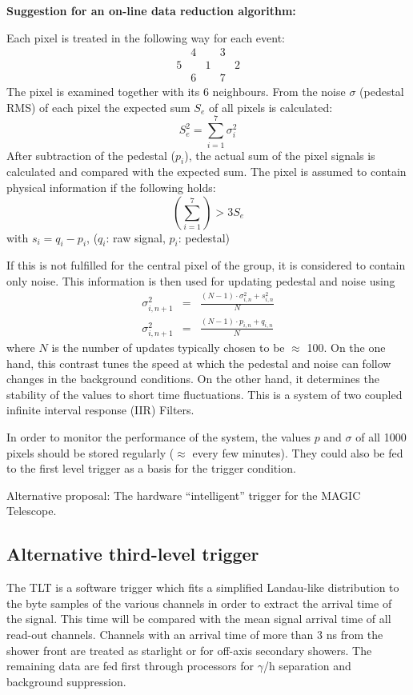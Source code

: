 \noindent
{\bf Suggestion for an on-line data reduction algorithm:}

\nopagebreak

Each pixel is treated in the following way for each event: 
\[
\begin{array}{ccccc}
& 4 &  & 3 &  \\ 
5 &  & 1 &  & 2 \\ 
& 6 &  & 7 & 
\end{array}
\]
The pixel is examined together with its 6 neighbours. From the noise $\sigma 
$ (pedestal RMS) of each pixel the expected sum $S_{e}$ of all pixels
is calculated: 
\[
S_{e}^{2}=\sum_{i=1}^{7}\sigma _{i}^{2}
\]
After subtraction of the pedestal ($p_{i}$), the actual sum of the pixel
signals is calculated and compared with the expected sum. The pixel is
assumed to contain physical information if the following holds: 
\[
\left( \sum_{i=1}^{7}\right) >3S_{e}
\]
with $s_{i}=q_{i}-p_{i}$, ($q_{i}$: raw signal, $p_{i}$: pedestal)

If this is not fulfilled for the central pixel of the group, it is
considered to contain only noise. This information is then used for updating
pedestal and noise using 
\begin{eqnarray*}
\sigma _{i,n+1}^{2} &=&\frac{(N-1)\cdot \sigma _{i,n}^{2}+s_{i,n}^{2}}{N} \\
\sigma _{i,n+1}^{2} &=&\frac{(N-1)\cdot p_{i,n}+q_{i,n}}{N}
\end{eqnarray*}
where $N$ is the number
of updates typically chosen to be $\approx $ 100. On the one
hand, this contrast tunes the speed at which the pedestal and noise can
follow changes in the background conditions. On the other hand, it
determines the stability of the values to short time fluctuations. This is a
system of two coupled infinite interval response (IIR) Filters.

In order to monitor the performance of the system, the values $p$ and $%
\sigma $ of all 1000 pixels should be stored regularly ($\approx$ every
few
minutes). They could also be fed to the first level trigger as a basis for
the trigger condition.

Alternative proposal: The hardware ``intelligent'' trigger for the MAGIC Telescope.

\subsection{Alternative third-level trigger}

The TLT is a software trigger which fits a simplified Landau-like
distribution to the byte samples of the various channels in order to extract
the arrival time of the signal. This time will be compared with the mean
signal arrival time of all read-out channels. Channels with an arrival time of
more than 3 ns from the shower front are treated as starlight or for
off-axis secondary showers. The remaining data are fed first through
processors for $\gamma$/h separation and background suppression. 

